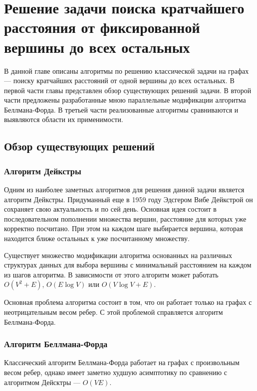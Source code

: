 \chapter{Решение задачи поиска кратчайшего расстояния от фиксированной вершины до всех остальных}
\label{chapSVD}

В данной главе описаны алгоритмы по решению классической задачи на графах --- поиску кратчайших расстояний от одной вершины до всех остальных. В первой части главы представлен обзор существующих решений задачи. В второй части предложены разработанные мною параллельные модификации алгоритма Беллмана-Форда. В третьей части реализованные алгоритмы сравниваются и выявляются области их применимости.

\FloatBarrier
\section{Обзор существующих решений}
\subsection{Алгоритм Дейкстры}

Одним из наиболее заметных алгоритмов для решения данной задачи является алгоритм Дейкстры. Придуманный еще в 1959 году Эдсгером Вибе Дейкстрой он сохраняет свою актуальность и по сей день. Основная идея состоит в последовательном пополнении множества вершин, расстояние для которых уже корректно посчитано. При этом на каждом шаге выбирается вершина, которая находится ближе остальных к уже посчитанному множеству. 

Существует множество модификации алгоритма основанных на различных структурах данных для выбора вершины с минимальный расстоянием на каждом из шагов алгоритма. В зависимости от этого алгоритм может работать $O(V^2+E)$, $O(E \log V)$ или $O(V \log V+E)$. 

Основная проблема алгоритма состоит в том, что он работает только на графах с неотрицательным весом ребер. С этой проблемой справляется алгоритм Беллмана-Форда. 


\FloatBarrier
\subsection{Алгоритм Беллмана-Форда}

Классический алгоритм Беллмана-Форда работает на графах с произвольным весом ребер, однако имеет заметно худшую асимптотику по сравнению с алгоритмом Дейсктры --- $O(VE)$. 

